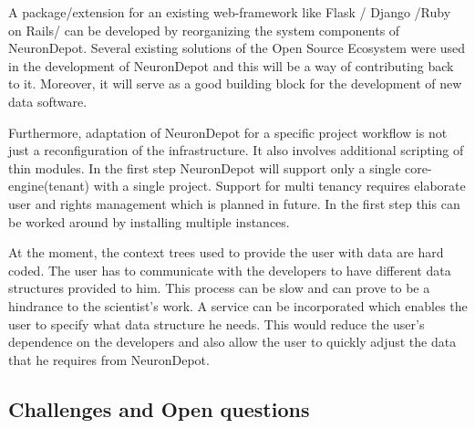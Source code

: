 \documentclass{frontiersSCNS} %
\begin{document}
A package/extension for an existing web-framework like Flask / Django /Ruby on
Rails/ can be developed by reorganizing the system components of NeuronDepot.
Several existing solutions of the Open Source Ecosystem were used in the
development of NeuronDepot and this will be a way of contributing back to it.
Moreover, it will serve as a good building block for the development of new
data software.

Furthermore, adaptation of NeuronDepot for a specific project workflow is not
just a reconfiguration of the infrastructure. It also involves additional
scripting of thin modules. In the first step NeuronDepot will support only a
single core-engine(tenant) with a single project. Support for multi tenancy
requires elaborate user and rights management which is planned in future. In
the first step this can be worked around by installing multiple instances.

At the moment, the context trees used to provide the user with data are hard
coded. The user has to communicate with the developers to have different data
structures provided to him. This process can be slow and can prove to be a
hindrance to the scientist's work. A service can be incorporated which enables
the user to specify what data structure he needs. This would reduce the user's
dependence on the developers and also allow the user to quickly adjust the data
that he requires from NeuronDepot.

\subsection{Challenges and Open questions}
\end{document}
